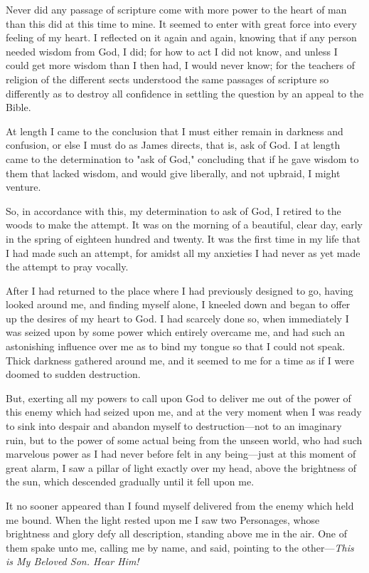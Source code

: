 Never did any passage of scripture come with more power to the heart of man than this did at
this time to mine. It seemed to enter with great force into every feeling of my heart. I
reflected on it again and again, knowing that if any person needed wisdom from God, I did;
for how to act I did not know, and unless I could get more wisdom than I then had, I would
never know; for the teachers of religion of the different sects understood the same passages
of scripture so differently as to destroy all confidence in settling the question by an appeal to
the Bible.

At length I came to the conclusion that I must either remain in darkness and confusion, or
else I must do as James directs, that is, ask of God. I at length came to the determination to
"ask of God," concluding that if he gave wisdom to them that lacked wisdom, and would give
liberally, and not upbraid, I might venture.

So, in accordance with this, my determination to ask of God, I retired to the woods to make
the attempt. It was on the morning of a beautiful, clear day, early in the spring of eighteen
hundred and twenty. It was the first time in my life that I had made such an attempt, for
amidst all my anxieties I had never as yet made the attempt to pray vocally.

After I had returned to the place where I had previously designed to go, having looked
around me, and finding myself alone, I kneeled down and began to offer up the desires of my
heart to God. I had scarcely done so, when immediately I was seized upon by some power
which entirely overcame me, and had such an astonishing influence over me as to bind my
tongue so that I could not speak. Thick darkness gathered around me, and it seemed to me for
a time as if I were doomed to sudden destruction.

But, exerting all my powers to call upon God to deliver me out of the power of this enemy
which had seized upon me, and at the very moment when I was ready to sink into despair and
abandon myself to destruction—not to an imaginary ruin, but to the power of some actual
being from the unseen world, who had such marvelous power as I had never before felt in
any being—just at this moment of great alarm, I saw a pillar of light exactly over my head,
above the brightness of the sun, which descended gradually until it fell upon me.

It no sooner appeared than I found myself delivered from the enemy which held me bound.
When the light rested upon me I saw two Personages, whose brightness and glory defy all
description, standing above me in the air. One of them spake unto me, calling me by name,
and said, pointing to the other—\textit{This is My Beloved Son. Hear Him!}

